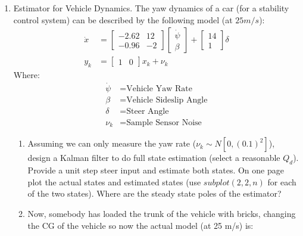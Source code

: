 \documentclass[11pt]{article}
\begin{document}
\begin{enumerate}[label=\textbf{\arabic*.}]
  \item Estimator for Vehicle Dynamics. The yaw dynamics of a car (for a 
  stability control system) can be described by the following model (at 
  $25 m/s$):
  \begin{equation*}
    \begin{split}
      \dot{x} &= 
      \begin{bmatrix}
        -2.62 & 12 \\ -0.96 & -2
      \end{bmatrix}
      \begin{bmatrix}
        \dot{\psi} \\ \beta 
      \end{bmatrix}
      + 
      \begin{bmatrix}
        14 \\ 1
      \end{bmatrix} 
      \delta \\
      y_k &= 
      \begin{bmatrix}
        1 & 0
      \end{bmatrix}
      x_k + \nu_k
    \end{split}
  \end{equation*}
  Where:
  \begin{equation*}
    \begin{split}
      \dot{\psi} &= \text{Vehicle Yaw Rate} \\
      \beta &= \text{Vehicle Sideslip Angle} \\
      \delta &= \text{Steer Angle} \\
      \nu_k &= \text{Sample Sensor Noise}
    \end{split}
  \end{equation*}
  \begin{enumerate}
    \itemsep -2pt 
    \item Assuming we can only measure the yaw rate ($\nu_k \sim N 
    [0,(0.1)^2]$), design a Kalman filter to do full state estimation (select a 
    reasonable $Q_d$). Provide a unit step steer input and estimate both states. 
    On one page plot the actual states and estimated states (use 
    $subplot(2,2,n)$ for each of the two states). Where are the steady state
    poles of the estimator?
    \item Now, somebody has loaded the trunk of the vehicle with bricks, 
    changing the CG of the vehicle so now the actual model (at 25 m/s) is:
    \begin{equation*}
      \begin{split}

\end{split}
\end{equation*}
\end{enumerate}
\end{enumerate}
\end{document}

